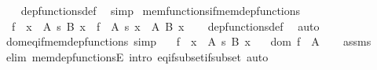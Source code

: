 \begin{isabellebody}
%
\isadelimproof
\ \ %
\endisadelimproof
%
\isatagproof
{}\isamarkupfalse%
\ dep{\isacharunderscore}{\kern0pt}functions{\isacharunderscore}{\kern0pt}def\ \isamarkupfalse%
\ simp%
\endisatagproof
{\isafoldproof}%
%
\isadelimproof
\isanewline
%
\endisadelimproof
\isanewline
{}\isamarkupfalse%
\ mem{\isacharunderscore}{\kern0pt}functions{\isacharunderscore}{\kern0pt}if{\isacharunderscore}{\kern0pt}mem{\isacharunderscore}{\kern0pt}dep{\isacharunderscore}{\kern0pt}functions{\isacharcolon}{\kern0pt}\isanewline
\ \ {\isachardoublequoteopen}f\ {\isasymin}\ {\isacharparenleft}{\kern0pt}x\ {\isasymin}\ A{\isacharparenright}{\kern0pt}\ {\isasymrightarrow}s\ {\isacharparenleft}{\kern0pt}B\ x{\isacharparenright}{\kern0pt}\ {\isasymLongrightarrow}\ f\ {\isasymin}\ {\isacharparenleft}{\kern0pt}A\ {\isasymrightarrow}s\ {\isacharparenleft}{\kern0pt}{\isasymUnion}x\ {\isasymin}\ A{\isachardot}{\kern0pt}\ B\ x{\isacharparenright}{\kern0pt}{\isacharparenright}{\kern0pt}{\isachardoublequoteclose}\isanewline
%
\isadelimproof
\ \ %
\endisadelimproof
%
\isatagproof
{}\isamarkupfalse%
\ dep{\isacharunderscore}{\kern0pt}functions{\isacharunderscore}{\kern0pt}def\ \isamarkupfalse%
\ auto%
\endisatagproof
{\isafoldproof}%
%
\isadelimproof
\isanewline
%
\endisadelimproof
\isanewline
{}\isamarkupfalse%
\ dom{\isacharunderscore}{\kern0pt}eq{\isacharunderscore}{\kern0pt}if{\isacharunderscore}{\kern0pt}mem{\isacharunderscore}{\kern0pt}dep{\isacharunderscore}{\kern0pt}functions\ {\isacharbrackleft}{\kern0pt}simp{\isacharbrackright}{\kern0pt}{\isacharcolon}{\kern0pt}\isanewline
\ \ \ {\isachardoublequoteopen}f\ {\isasymin}\ {\isacharparenleft}{\kern0pt}x\ {\isasymin}\ A{\isacharparenright}{\kern0pt}\ {\isasymrightarrow}s\ {\isacharparenleft}{\kern0pt}B\ x{\isacharparenright}{\kern0pt}{\isachardoublequoteclose}\isanewline
\ \ \ {\isachardoublequoteopen}dom\ f\ {\isacharequal}{\kern0pt}\ A{\isachardoublequoteclose}\isanewline
%
\isadelimproof
\ \ %
\endisadelimproof
%
\isatagproof
{}\isamarkupfalse%
\ assms\ \isamarkupfalse%
\ {\isacharparenleft}{\kern0pt}elim\ mem{\isacharunderscore}{\kern0pt}dep{\isacharunderscore}{\kern0pt}functionsE{\isacharcomma}{\kern0pt}\ intro\ eq{\isacharunderscore}{\kern0pt}if{\isacharunderscore}{\kern0pt}subset{\isacharunderscore}{\kern0pt}if{\isacharunderscore}{\kern0pt}subset{\isacharparenright}{\kern0pt}\ auto%
\endisatagproof
{\isafoldproof}%
%
\isadelimproof
\isanewline
%
\endisadelimproof

\end{isabellebody}

